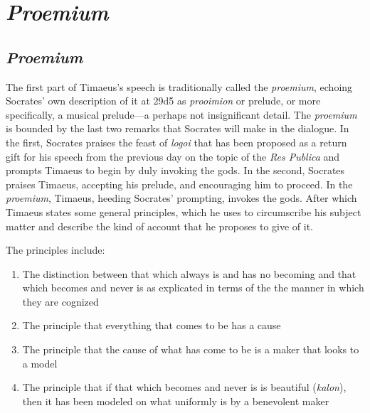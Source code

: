 
\chapter{\emph{Proemium}} %
\label{cha:proemium}

%
%


\section{\emph{Proemium}} %
\label{sec:proemium}

The first part of Timaeus's speech is traditionally called the \emph{proemium}, echoing Socrates' own description of it at 29d5 as \emph{prooimion} or prelude, or more specifically, a musical prelude---a perhaps not insignificant detail. The \emph{proemium} is bounded by the last two remarks that Socrates will make in the dialogue. In the first, Socrates praises the feast of \emph{logoi} that has been proposed as a return gift for his speech from the previous day on the topic of the \emph{Res Publica} and prompts Timaeus to begin by duly invoking the gods. In the second, Socrates praises Timaeus, accepting his prelude, and encouraging him to proceed. In the \emph{proemium}, Timaeus, heeding Socrates' prompting, invokes the gods. After which Timaeus states some general principles, which he uses to circumscribe his subject matter and describe the kind of account that he proposes to give of it. 

The principles include:
\begin{enumerate}[(1)]
	\item The distinction between that which always is and has no becoming and that which becomes and never is as explicated in terms of the the manner in which they are cognized
	\item The principle that everything that comes to be has a cause
	\item The principle that the cause of what has come to be is a maker that looks to a model
	\item The principle that if that which becomes and never is is beautiful (\emph{kalon}), then it has been modeled on what uniformly is by a benevolent maker
\end{enumerate}

